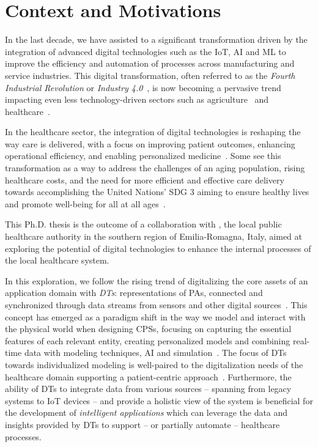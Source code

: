 \glsresetall

\section*{Context and Motivations}

In the last decade, we have assisted to a significant transformation driven by the integration of advanced digital technologies such as the \ac{IoT}, \ac{AI} and \ac{ML} to improve the efficiency and automation of processes across manufacturing and service industries.
This digital transformation, often referred to as the \emph{Fourth Industrial Revolution} or \emph{Industry 4.0}~\cite{Lasi_Fettke_Kemper_Feld_Hoffmann_2014,kagermann2013industrie}, 
is now becoming a pervasive trend impacting even less technology-driven sectors such as agriculture~\cite{Liu_Ma_Shu_Hancke_Abu-Mahfouz_2021} and healthcare~\cite{Tortorella_Fogliatto_Mac_Cawley_Vergara_Vassolo_Sawhney_2020}.

In the healthcare sector, the integration of digital technologies is reshaping the way care is delivered, with a focus on improving patient outcomes, enhancing operational efficiency, and enabling personalized medicine~\cite{Kraus_Schiavone_Pluzhnikova_Invernizzi_2021}.
%
Some see this transformation as a way to address the challenges of an aging population, rising healthcare costs, and the need for more efficient and effective care delivery towards accomplishing the United Nations' \ac{SDG} 3 aiming to ensure healthy lives and promote well-being for all at all ages~\cite{un_sdg_report_2025}.

This Ph.D. thesis is the outcome of a collaboration with \auslLong{}, the local public healthcare authority in the southern region of Emilia-Romagna, Italy, aimed at exploring the potential of digital technologies to enhance the internal processes of the local healthcare system. 

In this exploration, we follow the rising trend of digitalizing the core assets of an application domain with \emph{\acp{DT}}: representations of \acp{PA}, connected and synchronized through data streams from sensors and other digital sources~\cite{Grieves_2023}.
%
This concept has emerged as a paradigm shift in the way we model and interact with the physical world when designing \acp{CPS}, focusing on capturing the essential features of each relevant entity, creating personalized models and combining real-time data with modeling techniques, \ac{AI} and simulation~\cite{Semeraro_Lezoche_Panetto_Dassisti_2021}.
%
The focus of \acp{DT} towards individualized modeling is well-paired to the digitalization needs of the healthcare domain supporting a patient-centric approach~\cite{Alazab_Khan_Koppu_Ramu_M_Boobalan_Baker_Maddikunta_Gadekallu_Aljuhani_2023}.
%
Furthermore, the ability of \acp{DT} to integrate data from various sources
-- spanning from legacy systems to \ac{IoT} devices --
and provide a holistic view of the system is beneficial for the development of \emph{intelligent applications} which can leverage the data and insights provided by \acp{DT} to support -- or partially automate -- healthcare processes.

